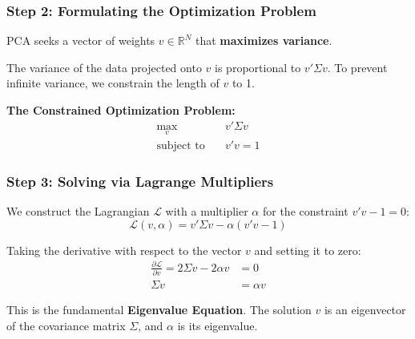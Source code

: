 \documentclass[aspectratio=169,11pt]{beamer}
\begin{document}
\begin{frame}
    \frametitle{Step 2: Formulating the Optimization Problem}
    
    \vspace{0.5cm}
    {\Large PCA seeks a vector of weights $v \in \mathbb{R}^N$ that \textbf{maximizes variance}.}
    
    \vspace{0.8cm}
    The variance of the data projected onto $v$ is proportional to $v' \Sigma v$. To prevent infinite variance, we constrain the length of $v$ to 1.
    
    \vspace{0.5cm}
    \textbf{The Constrained Optimization Problem:}
    \begin{align*}
        \max_{v} \quad & v' \Sigma v \\
        \text{subject to} \quad & v'v = 1
    \end{align*}
\end{frame}

\begin{frame}[shrink=10]
    \frametitle{Step 3: Solving via Lagrange Multipliers}
    
    \vspace{0.5cm}
    We construct the Lagrangian $\mathcal{L}$ with a multiplier $\alpha$ for the constraint $v'v - 1 = 0$:
    \begin{equation*}
        \mathcal{L}(v, \alpha) = v' \Sigma v - \alpha (v'v - 1)
    \end{equation*}
    
    \vspace{0.5cm}
    Taking the derivative with respect to the vector $v$ and setting it to zero:
    \begin{align*}
        \frac{\partial \mathcal{L}}{\partial v} = 2 \Sigma v - 2 \alpha v &= 0 \\
        \Sigma v &= \alpha v
    \end{align*}
    
    \vspace{0.5cm}
    This is the fundamental \textbf{Eigenvalue Equation}. The solution $v$ is an eigenvector of the covariance matrix $\Sigma$, and $\alpha$ is its eigenvalue.
\end{frame}
\end{document}
